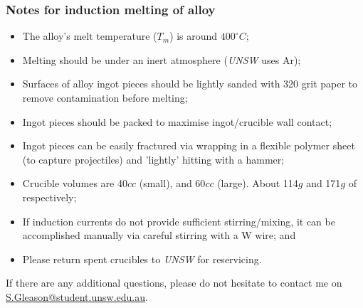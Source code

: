 \subsubsection{Notes for induction melting of \MgZnCa alloy}
\begin{itemize}
\item The \MgZnCa alloy's melt temperature ($T_{m}$) is around $400^{\circ}C$;
\item Melting should be under an inert atmosphere (\textit{UNSW} uses Ar);
\item Surfaces of alloy ingot pieces should be lightly sanded with 320 grit paper to remove contamination before melting;
\item Ingot pieces should be packed to maximise ingot/crucible wall contact;
\item Ingot pieces can be easily fractured via wrapping in a flexible polymer sheet (to capture projectiles) and 'lightly' hitting with a hammer;
\item Crucible volumes are 40$cc$ (small), and 60$cc$ (large). About 114$g$ and 171$g$ of \MgZnCa respectively;
\item If induction currents do not provide sufficient stirring/mixing, it can be accomplished manually via careful stirring with a W wire; and
\item Please return spent crucibles to \textit{UNSW} for reservicing. 
\end{itemize}

If there are any additional questions, please do not hesitate to contact me on \href{"mailto:s.gleason@student.unsw.edu.au"}{S.Gleason@student.unsw.edu.au}. 
